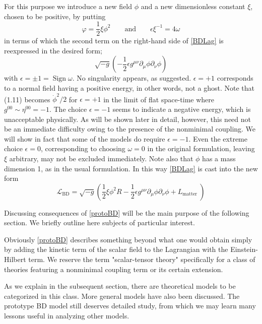 \documentclass[12pt]{article}
\begin{document}
For this purpose we introduce a new field $\phi$ and a new dimensionless constant $\xi$, chosen to be positive, by putting
\begin{equation}
\varphi=\frac{1}{2} \xi \phi^{2}  \qquad \text{and} \qquad \epsilon \xi^{-1}=4 \omega 
\end{equation}
in terms of which the second term on the right-hand side of \eqref{BDLag} is reexpressed in the desired form;
\begin{equation}
\sqrt{-g}\left(-\frac{1}{2} \epsilon g^{\mu \nu} \partial_{\mu} \phi \partial_{\nu} \phi\right) 
\end{equation}
with $\epsilon= \pm 1=\operatorname{Sign} \omega$.
No singularity appears, as suggested. 
$\epsilon=+1$ corresponds to a normal field having a positive energy, in other words, not a ghost. Note that (1.11) becomes $\dot{\phi}^{2} / 2$ for $\epsilon=+1$ in the limit of flat space-time where $g^{00} \sim \eta^{00}=-1$. The choice $\epsilon=-1$ seems to indicate a negative energy, which is unacceptable physically. 
As will be shown later in detail, however, this need not be an immediate difficulty owing to the presence of the nonminimal coupling. 
We will show in fact that some of the models do require $\epsilon=-1$. 
Even the extreme choice $\epsilon=0$, corresponding to choosing $\omega=0$ in the original formulation, leaving $\xi$ arbitrary, may not be excluded immediately. 
Note also that $\phi$ has a mass dimension 1, as in the usual formulation.
In this way \eqref{BDLag} is cast into the new form
\begin{equation} \label{protoBD}
\mathcal{L}_{\mathrm{BD}}=\sqrt{-g}\left(\frac{1}{2} \xi \phi^{2} R-\frac{1}{2} \epsilon g^{\mu \nu} \partial_{\mu} \phi \partial_{\nu} \phi+L_{\text {matter }}\right) 
\end{equation}


Discussing consequences of \eqref{protoBD} will be the main purpose of the following section. We briefly outline here subjects of particular interest.

Obviously \eqref{protoBD} describes something beyond what one would obtain simply by adding the kinetic term of the scalar field to the Lagrangian with the Einstein-Hilbert term. 
We reserve the term "scalar-tensor theory" specifically for a class of theories featuring a nonminimal coupling term or its certain extension.

As we explain in the subsequent section, there are theoretical models to be categorized in this class. More general models have also been discussed. The prototype BD model still deserves detailed study, from which we may learn many lessons useful in analyzing other models.
\end{document}
